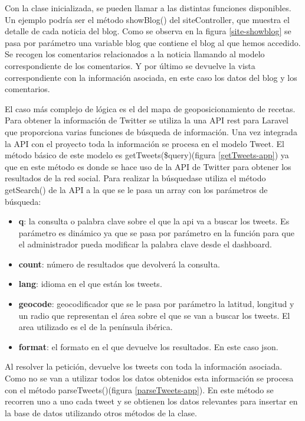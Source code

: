 \vspace{5 mm}

Con la clase inicializada, se pueden llamar a las distintas funciones disponibles. Un ejemplo podría ser el método showBlog() del siteController,
 que muestra el detalle de cada noticia del blog. Como se observa en la figura \ref{site-showblog} se pasa por parámetro una variable blog que contiene
 el blog al que hemos accedido. Se recogen los comentarios relacionados a la noticia llamando al modelo correspondiente de los comentarios. Y por último
 se devuelve la vista correspondiente con la información asociada, en este caso los datos del blog y los comentarios.

 El caso más complejo de lógica es el del mapa de geoposicionamiento de recetas. Para obtener la información de Twitter se utiliza la una API rest
 para Laravel que proporciona varias funciones de búsqueda de información. Una vez integrada la API con el proyecto toda la información se procesa en el
 modelo Tweet. El método básico de este modelo es getTweets(\$query)(figura \ref{getTweets-app}) ya que en este método es donde se hace uso de la API
 de Twitter para obtener los resultados de la red social. Para realizar la búsquedase utiliza el método getSearch() de la API a la que se le pasa un
 array con los parámetros de búsqueda:


 \begin{itemize}

 \item \textbf{q}: la consulta o palabra clave sobre el que la api va a buscar los tweets. Es parámetro es dinámico ya que se pasa por parámetro en la función para que el administrador pueda modificar la palabra clave desde el dashboard.

 \item \textbf{count}: número de resultados que devolverá la consulta.

 \item \textbf{lang}: idioma en el que están los tweets.

 \item \textbf{geocode}: geocodificador que se le pasa por parámetro la latitud, longitud y un radio que representan el área sobre el que se van a buscar los tweets. El area utilizado es el de la península ibérica.

 \item \textbf{format}: el formato en el que devuelve los resultados. En este caso json.

 \end{itemize}


 Al resolver la petición, devuelve los tweets con toda la información asociada. Como no se van a utilizar todos los datos obtenidos esta información
 se procesa con el método parseTweets()(figura \ref{parseTweets-app}). En este método se recorren uno a uno cada tweet y se obtienen los datos relevantes
 para insertar en la base de datos utilizando otros métodos de la clase.
